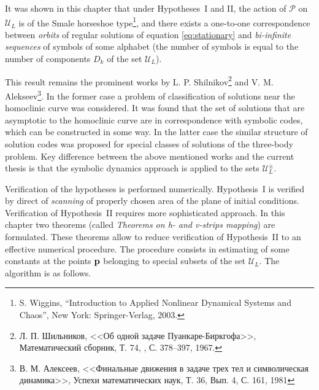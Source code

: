 \documentclass[candidate, href, colorlinks]{disser}
\begin{document}
It was shown in this chapter that under Hypotheses~I and II, the action of $\mathcal{P}$ on $\mathscr{U}_L$ is of the Smale horseshoe type\footnote{S. Wiggins, ``Introduction to Applied Nonlinear Dynamical Systems and Chaos'', New York: Springer-Verlag, 2003.}, and there exists a one-to-one correspondence between {\it orbits} of regular solutions of equation \eqref{eq:stationary} and {\it bi-infinite sequences} of symbols of some alphabet (the number of symbols is equal to the number of components $D_k$ of the set $\mathscr{U}_L$).

This result remains the prominent works by L. P. Shilnikov\footnote{Л. П. Шильников, <<Об одной задаче Пуанкаре-Биркгофа>>, Математический сборник, Т. 74, , С. 378--397,  1967.} and V. M. Alekseev\footnote{В. М. Алексеев, <<Финальные движения в задаче трех тел и символическая динамика>>, Успехи математических наук, Т. 36, Вып. 4, С. 161, 1981}.
In the former case a problem of classification of solutions near the homoclinic curve was considered.
It was found that the set of solutions that are asymptotic to the homoclinic curve are in correspondence with symbolic codes, which can be constructed in some way.
In the latter case the similar structure of solution codes was proposed for special classes of solutions of the three-body problem.
Key difference between the above mentioned works and the current thesis is that the symbolic dynamics approach is applied to the sets $\mathscr{U}_L^{\pm}$.

Verification of the hypotheses is performed numerically.
Hypothesis~I is verified by direct of {\it scanning} of properly chosen area of the plane of initial conditions.
Verification of Hypothesis~II requires more sophisticated approach.
In this chapter two theorems (called {\it Theorems on h- and v-strips mapping}) are formulated.
These theorems allow to reduce verification of Hypothesis~II to an effective numerical procedure.
The procedure consists in estimating of some constants at the points $\vb{p}$ belonging to special subsets of the set $\mathscr{U}_L$.
The algorithm is as follows.
\end{document}
